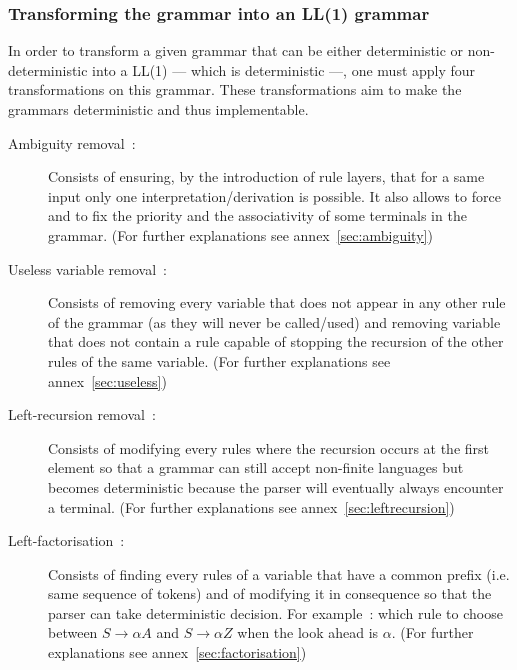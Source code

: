 \documentclass[a4paper,11pt]{article}
\begin{document}
    \subsubsection{Transforming the grammar into an LL(1) grammar}
      \label{grammartoll1methods}
      In order to transform a given grammar that can be either deterministic or non-deterministic into a LL(1) --- which is deterministic ---, one must apply four transformations on this grammar. These transformations aim to make the grammars deterministic and thus implementable.
      \begin{description}
        \item[Ambiguity removal~:] Consists of ensuring, by the introduction of rule layers, that for a same input only one interpretation/derivation is possible. It also allows to force and to fix the priority and the associativity of some terminals in the grammar. (For further explanations see annex~\ref{sec:ambiguity})
        \item[Useless variable removal~:] Consists of removing every variable that does not appear in any other rule of the grammar (as they will never be called/used) and removing variable that does not contain a rule capable of stopping the recursion of the other rules of the same variable. (For further explanations see annex~\ref{sec:useless})
        \item[Left-recursion removal~:] Consists of modifying every rules where the recursion occurs at the first element so that a grammar can still accept non-finite languages but becomes deterministic because the parser will eventually always encounter a terminal. (For further explanations see annex~\ref{sec:leftrecursion})
        \item[Left-factorisation~:] Consists of finding every rules of a variable that have a common prefix (i.e. same sequence of tokens) and of modifying it in consequence so that the parser can take deterministic decision. For example~: which rule to choose between $S \rightarrow \alpha A$ and $S \rightarrow \alpha Z$ when the look ahead is $\alpha$. (For further explanations see annex~\ref{sec:factorisation})
      \end{description}
  
\end{document}
